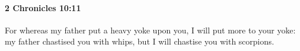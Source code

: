 
		\paragraph{2 Chronicles 10:11} %
			\label{2CHRONICLES-10-11}

			For whereas my father put a heavy yoke upon you, I will put more to your yoke: my father chastised you with whips, but I will chastise you with scorpions.


